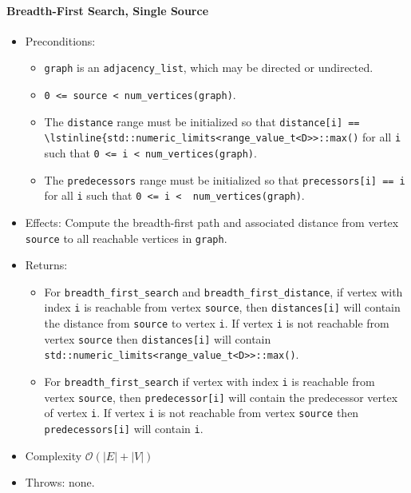 \paragraph{Breadth-First Search, Single Source}

{\small

}

\begin{itemize}
\item[] Preconditions:
\begin{itemize}
\item[]
\lstinline{graph} is an \lstinline{adjacency_list}, which may be directed or
undirected.
\item[]
\lstinline{0 <= source < num_vertices(graph)}.
\item[]
  The \lstinline{distance} range must be initialized so that 
    \lstinline{distance[i] == \lstinline{std::numeric_limits<range_value_t<D>>::max()} 
    for all \lstinline{i}
    such that \lstinline{0 <= i < num_vertices(graph)}.  
\item[]
  The \lstinline{predecessors} range must be initialized so that
  \lstinline{precessors[i] == i} for all \lstinline{i} such that 
  \lstinline{0 <= i <  num_vertices(graph)}.
\end{itemize}
\item[] 
Effects: Compute the breadth-first path and associated distance from vertex
\lstinline{source} to all reachable vertices in \lstinline{graph}.
\item[] 
Returns:
\begin{itemize}
\item[] For \lstinline{breadth_first_search} and \lstinline{breadth_first_distance},
  if vertex with index \lstinline{i} is reachable from vertex \lstinline{source}, then
  \lstinline{distances[i]} will contain the distance from \lstinline{source} to vertex
  \lstinline{i}.  If vertex \lstinline{i} is not reachable from vertex
  \lstinline{source} then \lstinline{distances[i]} will contain
  \lstinline{std::numeric_limits<range_value_t<D>>::max()}.
\item[]
For \lstinline{breadth_first_search} if vertex with index \lstinline{i} is reachable
from vertex \lstinline{source}, then \lstinline{predecessor[i]} will contain the
predecessor vertex of vertex \lstinline{i}.  If vertex \lstinline{i} is not reachable
from vertex \lstinline{source} then \lstinline{predecessors[i]} will contain
\lstinline{i}.
\end{itemize}
%
\item[] Complexity $\mathcal{O}(|E| + |V|)$
\item[] Throws: none. 
\end{itemize}


